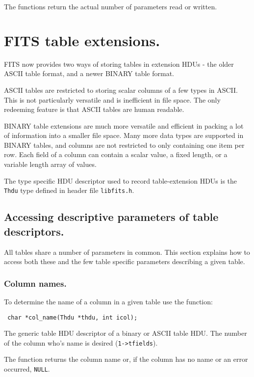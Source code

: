 The functions return the actual number of parameters read or written.

\section{FITS table extensions.}

FITS now provides two ways of storing tables in extension HDUs - the
older ASCII table format, and a newer BINARY table format.

ASCII tables are restricted to storing scalar columns of a few types
in ASCII. This is not particularly versatile and is inefficient in
file space. The only redeeming feature is that ASCII tables are human
readable.

BINARY table extensions are much more versatile and efficient in
packing a lot of information into a smaller file space. Many more data
types are supported in BINARY tables, and columns are not restricted
to only containing one item per row. Each field of a column can
contain a scalar value, a fixed length, or a variable length array of
values.

The type specific HDU descriptor used to record table-extension
HDUs is the \verb`Thdu` type defined in header file
\verb`libfits.h`.

\subsection{Accessing descriptive parameters of table descriptors.}

All tables share a number of parameters in common. This section
explains how to access both these and the few table specific
parameters describing a given table.

\subsubsection{Column names.}
To determine the name of a column in a given table use the function:
\label{col_name}\begin{verbatim}
 char *col_name(Thdu *thdu, int icol);
\end{verbatim}
\begin{arglist}
 The generic table HDU descriptor of a binary or ASCII
          table HDU.
 The number of the column who's name is desired
          (\verb`1->tfields`).
\end{arglist}

The function returns the column name or, if the column has no name
or an error occurred, \verb`NULL`.

